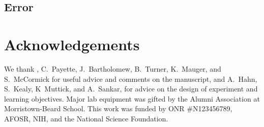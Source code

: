 \documentclass[aps,prl,preprint]{revtex4-1}
\begin{document}
\subsection{Error}

\section{Acknowledgements}
We thank , C.~Payette, J.~Bartholomew, B.~Turner, K.~Mauger, and S.~McCormick for useful advice and comments on the manuscript, and A.~Hahn, S.~Kealy, K~Muttick, and A.~Sankar, for advice on the design of experiment and learning objectives. Major lab equipment was gifted by the Alumni Association at Morristown-Beard School. This work was funded by ONR \#N123456789, AFOSR, NIH, and the National Science Foundation. 

\end{document}
